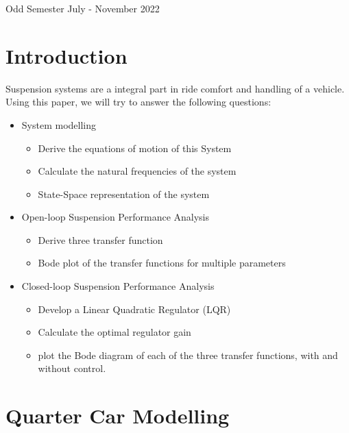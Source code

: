 \documentclass[12pt, a4paper, oneside]{report}
\begin{document}
\begin{titlepage}
\begin{figure}[h]
\label{logo}
\end{figure}

\begin{center}\large
    {Odd Semester July - November 2022}
\end{center}


\end{titlepage}



\newpage

\tableofcontents


\chapter{Introduction}

Suspension systems are a integral part in ride comfort and handling of a vehicle.
Using this paper, we will try to answer the following questions:
\begin{itemize}
    \item System modelling
    \begin{itemize}
        \item Derive the equations of motion of this System
        \item Calculate the natural frequencies of the system
        \item State-Space representation of the system
    \end{itemize}
    \item Open-loop Suspension Performance Analysis
    \begin{itemize}
        \item Derive three transfer function
        \item Bode plot of the transfer functions for multiple parameters
    \end{itemize}
    \item Closed-loop Suspension Performance Analysis
    \begin{itemize}
        \item Develop a Linear Quadratic Regulator (LQR)
        \item Calculate the optimal regulator gain
        \item plot the Bode diagram of each of the three transfer functions, with and without control.
    \end{itemize}
\end{itemize}

\chapter{Quarter Car Modelling}
\end{document}

